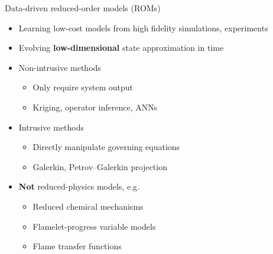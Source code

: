 \documentclass[]{beamer}
\begin{document}
\begin{frame}{Data-driven reduced-order models (ROMs)}
	\begin{itemize}
		\item Learning low-cost models from high fidelity simulations, experiments
		\item Evolving \textbf{low-dimensional} state approximation in time
		\item Non-intrusive methods
		\begin{itemize}
			\item Only require system output
			\item Kriging, operator inference, ANNs
		\end{itemize}
		\item Intrusive methods
		\begin{itemize}
			\item Directly manipulate governing equations
			\item Galerkin, Petrov--Galerkin projection
		\end{itemize}
		\item \textbf{Not} reduced-physics models, e.g.
		\begin{itemize}
			\item Reduced chemical mechanisms
			\item Flamelet-progress variable models
			\item Flame transfer functions
		\end{itemize}
	\end{itemize}
\end{frame}
\end{document}
